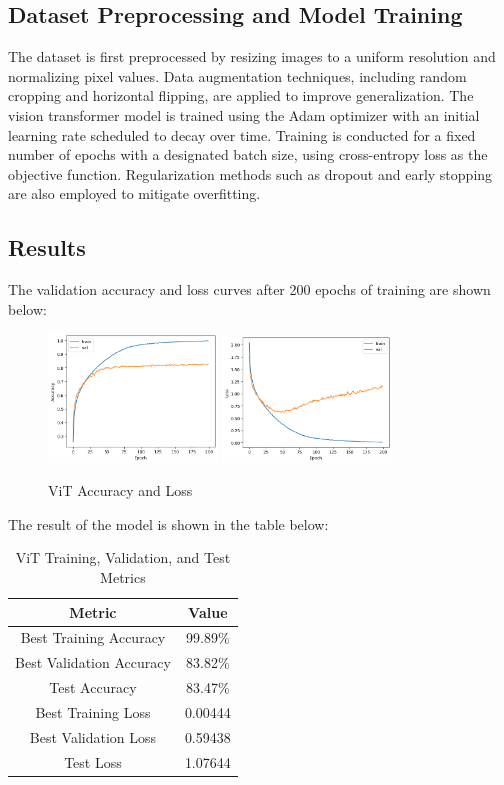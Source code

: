 \documentclass[12pt]{article}
\begin{document}
\subsection{Dataset Preprocessing and Model Training}
The dataset is first preprocessed by resizing images to a uniform resolution and normalizing pixel values. 
Data augmentation techniques, including random cropping and horizontal flipping, are applied to improve generalization. 
The vision transformer model is trained using the Adam optimizer with an initial learning rate scheduled to decay over time. 
Training is conducted for a fixed number of epochs with a designated batch size, using cross-entropy loss as the objective function. 
Regularization methods such as dropout and early stopping are also employed to mitigate overfitting.
\subsection{Results}
The validation accuracy and loss curves after 200 epochs of training are shown below:
\begin{figure}[H]
    \centering
    \includegraphics[width=0.4\textwidth]{./src/vit_acc.png}
    \includegraphics[width=0.4\textwidth]{./src/vit_loss.png}
    \caption{ViT Accuracy and Loss}
\end{figure}
The result of the model is shown in the table below:
\begin{table}[H]
    \centering
    \begin{tabular}{c|c}
        \hline
        Metric & Value \\
        \hline
        Best Training Accuracy & 99.89\% \\
        Best Validation Accuracy & 83.82\% \\
        Test Accuracy & 83.47\% \\
        Best Training Loss & 0.00444 \\
        Best Validation Loss & 0.59438 \\
        Test Loss & 1.07644 \\
        \hline
    \end{tabular}
    \caption{ViT Training, Validation, and Test Metrics}
\end{table}
\end{document}
